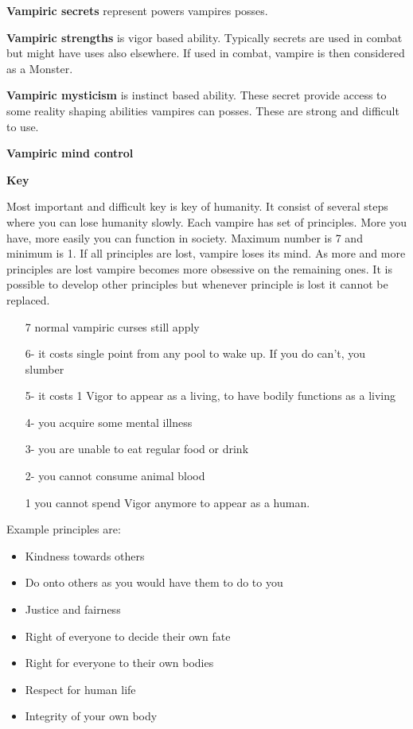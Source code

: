 \documentclass[a4paper, 12pt, finnish]{article}
\begin{document}
{\textbf{Vampiric secrets} represent powers vampires posses.

\textbf{Vampiric strengths } is vigor based ability. 
Typically secrets are used in combat but might have uses also elsewhere.
If used in combat, vampire is then considered as a Monster.


\cols{
\VampiricStrengthSecret{}
}

\textbf{Vampiric mysticism } is instinct based ability.
These secret provide access to some reality shaping abilities vampires can posses.
These are strong and difficult to use.


\cols{
\VampiricMysticismSecret{}
}

\textbf{Vampiric mind control }

\cols{
\VampiricMindControlSecret{}
}

\pagebreak


\textbf{Key}

Most important and difficult key is key of humanity. It consist of several steps where you can lose humanity slowly. 
Each vampire has set of principles.
More you have, more easily you can function in society.
Maximum number is 7 and minimum is 1.
If all principles are lost, vampire loses its mind.
As more and more principles are lost vampire becomes more obsessive on the remaining ones.
It is possible to develop other principles but whenever principle is lost it cannot be replaced.


\begin{itemize}
\setlength\itemsep{-2pt}
\item[7] normal vampiric curses still apply
\item[6-] it costs single point from any pool to wake up. If you do can't, you slumber
\item[5-] it costs 1 Vigor to appear as a living, to have bodily functions as a living
\item[4-] you acquire some mental illness
\item[3-] you are unable to eat regular food or drink
\item[2-] you cannot consume animal blood
\item[1] you cannot spend Vigor anymore to appear as a human.
\end{itemize}

Example principles are:
\begin{itemize}
\setlength\itemsep{-2pt}
\item Kindness towards others
\item Do onto others as you would have them to do to you
\item Justice and fairness
\item Right of everyone to decide their own fate
\item Right for everyone to their own bodies
\item Respect for human life
\item Integrity of your own body
\end{itemize}

}
\end{document}
